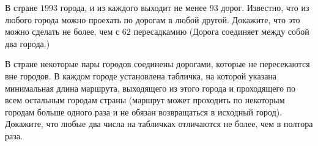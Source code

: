 \begin{exersize}
	В стране $1993$ города, и из каждого выходит не менее $93$ дорог. Известно, что из любого города можно проехать по дорогам в любой другой. Докажите, что это можно сделать не более, чем с $62$ пересадкамию (Дорога соединяет между собой два города.)
\end{exersize}	 

\begin{exersize}
	В стране некоторые пары городов соединены дорогами, которые не пересекаются вне городов. В каждом городе установлена табличка, на которой указана минимальная длина маршрута, выходящего из этого города и проходящего по всем остальным городам страны (маршрут может проходить по некоторым городам больше одного раза и не обязан возвращаться в исходный город). Докажите, что любые два числа на табличках отличаются не более, чем в полтора раза.
\end{exersize}	  

